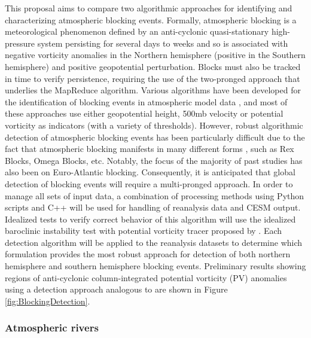 \documentclass[11pt]{article}
\begin{document}
This proposal aims to compare two algorithmic approaches for identifying and characterizing atmospheric blocking events.  Formally, atmospheric blocking is a meteorological phenomenon defined by an anti-cyclonic quasi-stationary high-pressure system persisting for several days to weeks and so is associated with negative vorticity anomalies in the Northern hemisphere (positive in the Southern hemisphere) and positive geopotential perturbation.  Blocks must also be tracked in time to verify persistence, requiring the use of the two-pronged approach that underlies the MapReduce algorithm.  Various algorithms have been developed for the identification of blocking events in atmospheric model data \citep{tibaldi1990operational, wiedenmann2002climatology, pelly2003new, scherrer2006two, tyrlis2008aspects, barriopedro2010application, barnes2012methodology}, and most of these approaches use either geopotential height, 500mb velocity or potential vorticity as indicators (with a variety of thresholds).  However, robust algorithmic detection of atmospheric blocking events has been particularly difficult due to the fact that atmospheric blocking manifests in many different forms \citep{haby2008blocking}, such as Rex Blocks, Omega Blocks, etc.  Notably, the focus of the majority of past studies has also been on Euro-Atlantic blocking.  Consequently, it is anticipated that global detection of blocking events will require a multi-pronged approach.  In order to manage all sets of input data, a combination of processing methods using Python scripts and C++ will be used for handling of reanalysis data and CESM output.  Idealized tests to verify correct behavior of this algorithm will use the idealized baroclinic instability test with potential vorticity tracer proposed by \cite{JPWCJJKRBR2013QJRMS}.  Each detection algorithm will be applied to the reanalysis datasets to determine which formulation provides the most robust approach for detection of both northern hemisphere and southern hemisphere blocking events.  Preliminary results showing regions of anti-cyclonic column-integrated potential vorticity (PV) anomalies using a detection approach analogous to \cite{scherrer2006two} are shown in Figure \ref{fig:BlockingDetection}.

\subsubsection{Atmospheric rivers}
\end{document}
